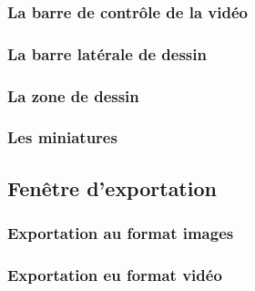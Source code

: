 	\subsubsection{La barre de contrôle de la vidéo}
	
	\subsubsection{La barre latérale de dessin}
	
	\subsubsection{La zone de dessin}
	
	\subsubsection{Les miniatures}

\subsection{Fenêtre d'exportation}
	\subsubsection{Exportation au format images}
	
	\subsubsection{Exportation eu format vidéo}